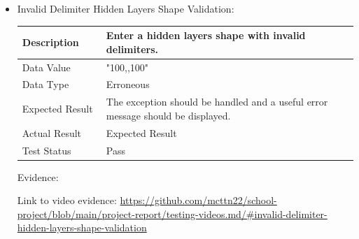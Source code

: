 \documentclass[./project-report/src/latex/project-report.tex]{subfiles}
\begin{document}
\begin{itemize}
	\item Invalid Delimiter Hidden Layers Shape Validation: \newline\newline
		\begin{tabular}{|p{0.25\linewidth}|p{0.75\linewidth}|}
			\hline
			Description & Enter a hidden layers shape with invalid delimiters. \\
			\hline
			Data Value & "100,,100" \\
			\hline
			Data Type & Erroneous \\
			\hline
			Expected Result & The exception should be handled and a useful error message should be displayed. \\
			\hline
			Actual Result & Expected Result \\
			\hline
			Test Status & Pass \\
			\hline
		\end{tabular}

		\vspace{5mm}

		Evidence:
		\begin{figure}[h!]
		\centering
		\end{figure}

		\begin{sloppypar}
		Link to video evidence: \url{https://github.com/mcttn22/school-project/blob/main/project-report/testing-videos.md/#invalid-delimiter-hidden-layers-shape-validation}
		\end{sloppypar}
\end{itemize}
\end{document}
